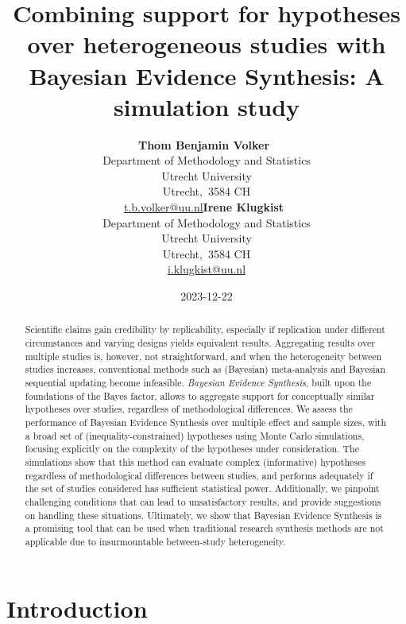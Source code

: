 \documentclass[
]{article}
\title{Combining support for hypotheses over heterogeneous studies with
Bayesian Evidence Synthesis: A simulation study}
\author{\textbf{Thom Benjamin
Volker}~\orcidlink{0000-0002-2408-7820}\\Department of Methodology and
Statistics\\Utrecht University\\Utrecht,\ 3584
CH\\\href{mailto:t.b.volker@uu.nl}{t.b.volker@uu.nl}\asep\textbf{Irene
Klugkist}~\orcidlink{0000-0001-9561-3691}\\Department of Methodology and
Statistics\\Utrecht University\\Utrecht,\ 3584
CH\\\href{mailto:i.klugkist@uu.nl}{i.klugkist@uu.nl}}
\date{2023-12-22}
\begin{document}
\maketitle
\begin{abstract}
Scientific claims gain credibility by replicability, especially if
replication under different circumstances and varying designs yields
equivalent results. Aggregating results over multiple studies is,
however, not straightforward, and when the heterogeneity between studies
increases, conventional methods such as (Bayesian) meta-analysis and
Bayesian sequential updating become infeasible. \emph{Bayesian Evidence
Synthesis}, built upon the foundations of the Bayes factor, allows to
aggregate support for conceptually similar hypotheses over studies,
regardless of methodological differences. We assess the performance of
Bayesian Evidence Synthesis over multiple effect and sample sizes, with
a broad set of (inequality-constrained) hypotheses using Monte Carlo
simulations, focusing explicitly on the complexity of the hypotheses
under consideration. The simulations show that this method can evaluate
complex (informative) hypotheses regardless of methodological
differences between studies, and performs adequately if the set of
studies considered has sufficient statistical power. Additionally, we
pinpoint challenging conditions that can lead to unsatisfactory results,
and provide suggestions on handling these situations. Ultimately, we
show that Bayesian Evidence Synthesis is a promising tool that can be
used when traditional research synthesis methods are not applicable due
to insurmountable between-study heterogeneity.
\end{abstract}
\ifdefined\Shaded\renewenvironment{Shaded}{\begin{tcolorbox}[frame hidden, sharp corners, boxrule=0pt, interior hidden, borderline west={3pt}{0pt}{shadecolor}, breakable, enhanced]}{\end{tcolorbox}}\fi

\hypertarget{introduction}{%
\section{Introduction}\label{introduction}}
\end{document}
